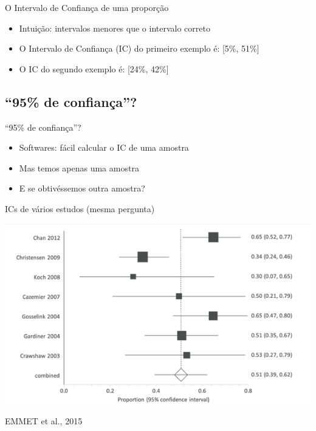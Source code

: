 \documentclass{beamer}
\begin{document}
\begin{frame}{\scriptsize O Intervalo de Confiança de uma proporção}
  \begin{itemize}
    \footnotesize
  \item Intuição: intervalos menores que o intervalo correto
  \item O \alert{Intervalo de Confiança} (IC) do primeiro exemplo é: [5\%, 51\%]
  \item O IC do segundo exemplo é: [24\%, 42\%]
  \end{itemize}
\end{frame}


\subsection{``95\% de confiança''?}

\begin{frame}{\scriptsize ``95\% de confiança''?}
  \begin{itemize}
    \footnotesize
  \item Softwares: fácil calcular o IC de uma amostra
  \item Mas temos apenas \alert{uma} amostra
  \item E se obtivéssemos outra amostra?
  \end{itemize}
\end{frame}

\begin{frame}{\scriptsize ICs de vários estudos (mesma pergunta)}
  \begin{center}
    \includegraphics[width=.8\textwidth]{Cap2/IC-prop-n-amostras.png}
  \end{center}

  \vfill
  \hfill \tiny EMMET et al., 2015
\end{frame}
\end{document}
